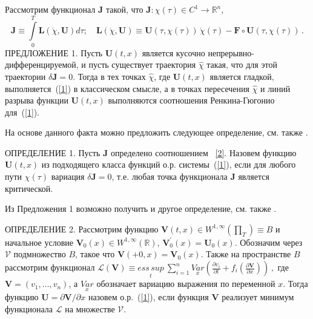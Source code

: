 Рассмотрим функционал $\mathbf{J}$ такой, что
$\mathbf{J}:\chi(\tau)\in C^{1}\rightarrow\mathbb{R}^{n}$,
\begin{equation}\label{2}
\mathbf{J}\equiv\int\limits_{0}^{T}\mathbf{L}(\dot{\chi},\mathbf{U})d\tau;\quad\mathbf{L}(\dot{\chi},\mathbf{U})\equiv\mathbf{U}(\tau,\chi(\tau))
\,\dot{\chi}(\tau)-\mathbf{F}\circ\mathbf{U}(\tau,\chi(\tau))\,.
\end{equation}
ПРЕДЛОЖЕНИЕ 1. Пусть $\mathbf{U}(t,x)$ является кусочно
непрерывно-дифференцируемой, и пусть существует траектория
$\hat{\chi}$ такая, что для этой траектории $\delta\mathbf{J}=0$.
Тогда в тех точках $\hat{\chi}$, где $\mathbf{U}(t,x)$ является
гладкой, выполняется~(\ref{1}) в классическом смысле, а в точках
пересечения $\hat{\chi}$ и линий разрыва функции $\mathbf{U}(t,x)$
выполняются соотношения Ренкина-Гюгонио для~(\ref{1}).

На основе данного факта можно предложить следующее определение, см.
также \cite{R1}.

ОПРЕДЕЛЕНИЕ 1. Пусть $\mathbf{J}$ определено соотношением
~\eqref{2}. Назовем функцию $\mathbf{U}(t,x)$ из подходящего класса
функций о.р. системы~(\ref{1}), если для любого пути $\chi(\tau)$
вариация $\delta\mathbf{J}=0$, т.е. любая точка функционала
$\mathbf{J}$ является критической.

Из Предложения 1 возможно получить и другое определение, см. также
\cite{R2}.

ОПРЕДЕЛЕНИЕ 2. Рассмотрим функцию $\mathbf{V}(t,x)\in
W^{1,\infty}(\prod_{T})\equiv B$ и начальное условие
$\mathbf{V}_{0}(x)\in W^{1,\infty}(\mathbb{R})$,
$\mathbf{V}_{0}^{\prime}(x)=\mathbf{U}_{0}(x)$. Обозначим через
$\mathcal V$ подмножество $B$, такое что
$\mathbf{V}(+0,x)=\mathbf{V}_{0}(x)$. Также на пространстве $B$
рассмотрим функционал ${\mathcal L}(\mathbf{V})\equiv\underset
{t}{ess\,sup}\ \sum_{i=1}^{n}\underset{x}{Var}\left(\frac{\partial
v_{i}}{\partial t}+f_{i}\left(\frac{\partial\mathbf{V}}{\partial
x}\right)\right)\,,$
где $\mathbf{V}=\left(v_{1},\ldots,v_{n}\right)$, а
$\underset{x}{Var}$ обозначает вариацию выражения по переменной
$x$. Тогда функцию $\mathbf{U}=\partial\mathbf{V}/\partial x$
назовем о.р.~(\ref{1}), если функция $\mathbf{V}$ реализует минимум
функционала $\mathcal L$ на множестве $\mathcal V$.

